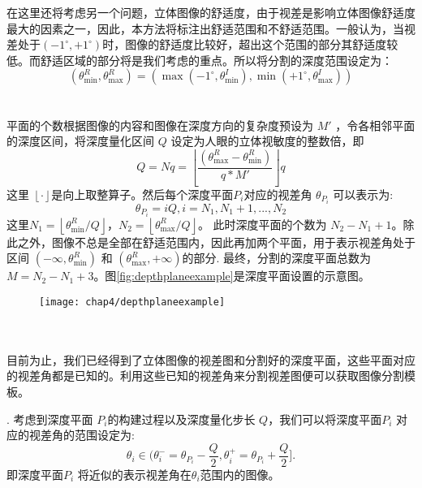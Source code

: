 在这里还将考虑另一个问题，立体图像的舒适度，由于视差是影响立体图像舒适度最大的因素之一，因此，本方法将标注出舒适范围和不舒适范围。一般认为，当视差处于$( - 1^\circ , + 1^\circ )$时，图像的舒适度比较好\parencite{lambooij2009visual}，超出这个范围的部分其舒适度较低。而舒适区域的部分将是我们考虑的重点。所以将分割的深度范围设定为：
\begin{equation}
(\theta _{\min }^R,\theta _{\max }^R) = (\max ( - {1^\circ },\theta _{\min }^I),\min ( + {1^\circ },\theta _{\max }^I))
\end{equation}
\\[0.2cm]
\\[0.2cm]
平面的个数根据图像的内容和图像在深度方向的复杂度预设为
 $M'$ ，令各相邻平面的深度区间，将深度量化区间 $Q$ 设定为人眼的立体视敏度的整数倍，即
\begin{equation}
Q = Nq = \left\lfloor{\frac{{(\theta _{\max }^R - \theta _{\min }^R)}}{{q*M'}}} \right\rfloor q
\end{equation}
这里 $\left\lfloor \cdot \right\rfloor$是向上取整算子。然后每个深度平面${P_i}$对应的视差角
 $\theta_{P_i}$ 可以表示为:
\begin{equation}
{\theta _{{P_i}}} = iQ,  i = {N_1},{N_1} + 1,...,{N_2}
\end{equation}
这里${N_1} = \left\lfloor {\theta _{\min }^R/Q} \right\rfloor，
{N_2} = \left\lfloor {\theta _{\max }^R/Q} \right\rfloor $。
此时深度平面的个数为 ${N_2} - {N_1} + 1$。除此之外，图像不总是全部在舒适范围内，因此再加两个平面，用于表示视差角处于区间 $(-\infty ,\theta_{\min }^R)$
和 $(\theta _{\max }^R, +\infty)$的部分.
最终，分割的深度平面总数为 $M = {N_2} - {N_1} + 3$。图\ref{fig:depthplaneexample}是深度平面设置的示意图。
\begin{figure}[t]
  \centering
  \texttt{[image: chap4/depthplaneexample]}
\end{figure}
\\[0.2cm]
\\[0.2cm]
目前为止，我们已经得到了立体图像的视差图和分割好的深度平面，这些平面对应的视差角都是已知的。利用这些已知的视差角来分割视差图便可以获取图像分割模板。

\uppercase\expandafter{}.
考虑到深度平面 ${P_i}$的构建过程以及深度量化步长 $Q$，我们可以将深度平面${P_i}$ 对应的视差角的范围设定为:
\begin{equation}
\label{eq:depthplanedisparityrange}
{\theta _i} \in (\theta_i^- = \theta_{P_i} - \frac{Q}{2}, \theta _i^+ = \theta_{P_i} + \frac{Q}{2}].
\end{equation}
即深度平面${P_i}$ 将近似的表示视差角在${\theta _i}$范围内的图像。

